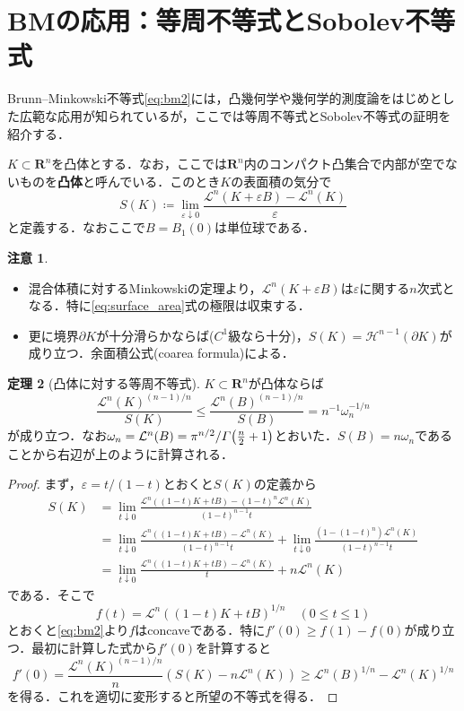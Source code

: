 \documentclass[a4j]{ltjsarticle}
\newcommand{\Rset}{\mathbf{R}}
\newcommand{\Lm}{\mathcal{L}}
\newcommand{\Hm}{\mathcal{H}}
\newcommand{\1}{\bm{1}}
\numberwithin{equation}{section}
\theoremstyle{definition}
\newtheorem{thm}{定理}[section]
\newtheorem{rmk}[thm]{注意}
\begin{document}
\section{BMの応用：等周不等式とSobolev不等式}
Brunn--Minkowski不等式\eqref{eq:bm2}には，凸幾何学や幾何学的測度論をはじめとした広範な応用が知られているが，ここでは等周不等式とSobolev不等式の証明を紹介する．

$K\subset\Rset^n$を凸体とする．なお，ここでは$\Rset^n$内のコンパクト凸集合で内部が空でないものを\textbf{凸体}と呼んでいる．このとき$K$の表面積の気分で
\begin{equation}
    S(K)\coloneqq \lim_{\varepsilon\downarrow 0}\frac{\Lm^n(K+\varepsilon B)-\Lm^n(K)}{\varepsilon} \label{eq:surface_area}
\end{equation}
と定義する．なおここで$B=B_{1}(0)$は単位球である．
\begin{rmk}
    \begin{itemize}
        \item 混合体積に対するMinkowskiの定理より，$\Lm^n(K+\varepsilon B)$は$\varepsilon$に関する$n$次式となる．特に\eqref{eq:surface_area}式の極限は収束する．
        \item 更に境界$\partial K$が十分滑らかならば($C^1$級なら十分)，$S(K)=\Hm^{n-1}(\partial K)$が成り立つ．余面積公式(coarea formula)による．
    \end{itemize}
\end{rmk}
\begin{thm}[凸体に対する等周不等式]
    $K\subset\Rset^n$が凸体ならば
    \begin{equation}
        \frac{\Lm^n(K)^{(n-1)/n}}{S(K)}\leq \frac{\Lm^n(B)^{(n-1)/n}}{S(B)}=n^{-1}\omega_n^{-1/n}\label{eq:isop_ineq_conv}\tag{IP1}
    \end{equation}
    が成り立つ．なお$\omega_n=\Lm^n(B)=\pi^{n/2}/\varGamma\qty(\frac{n}{2}+1)$とおいた．$S(B)=n\omega_n$であることから右辺が上のように計算される．
\end{thm}
\begin{proof}
    まず，$\varepsilon=t/(1-t)$とおくと$S(K)$の定義から
    \begin{align}
        S(K)&=\lim_{t\downarrow0}\frac{\Lm^n((1-t)K+tB)-(1-t)^n\Lm^n(K)}{(1-t)^{n-1}t}\\
        &=\lim_{t\downarrow0}\frac{\Lm^n((1-t)K+tB)-\Lm^n(K)}{(1-t)^{n-1}t}+\lim_{t\downarrow0}\frac{(1-(1-t)^n)\Lm^n(K)}{(1-t)^{n-1}t}\\
        &=\lim_{t\downarrow 0}\frac{\Lm^n((1-t)K+tB)-\Lm^n(K)}{t}+n\Lm^n(K)
    \end{align}
    である．そこで
    \begin{equation}
        f(t)=\Lm^n((1-t)K+tB)^{1/n}\quad (0\leq t\leq 1)
    \end{equation}
    とおくと\eqref{eq:bm2}より$f$はconcaveである．特に$f'(0)\geq f(1)-f(0)$が成り立つ．最初に計算した式から$f'(0)$を計算すると
    \begin{equation}
        f'(0)=\frac{\Lm^n(K)^{(n-1)/n}}{n}(S(K)-n\Lm^n(K))\geq \Lm^n(B)^{1/n}-\Lm^n(K)^{1/n}
    \end{equation}
    を得る．これを適切に変形すると所望の不等式を得る．
\end{proof}
\end{document}
